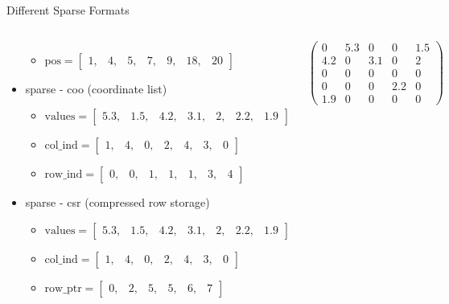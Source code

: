 \documentclass[aspectratio=169,xcolor=dvipsnames]{beamer}
\begin{document}
\begin{frame}{Different Sparse Formats}
\begin{columns}[c]
\begin{itemize}
\begin{itemize}
		\item $\mathrm{pos} = \begin{bmatrix}
		1, & 4, & 5, & 7, & 9, & 18, & 20 
		\end{bmatrix}$
	\end{itemize}
\item sparse - coo (coordinate list)
	\begin{itemize}
		\item $\mathrm{values} = \begin{bmatrix}
		5.3, & 1.5, & 4.2, & 3.1, & 2, & 2.2, & 1.9 
		\end{bmatrix}$
		\item $\mathrm{col\_ind} = \begin{bmatrix}
		1, & 4, & 0, & 2, & 4, & 3, & 0 
		\end{bmatrix}$
		\item $\mathrm{row\_ind} = \begin{bmatrix}
		0, & 0, & 1, & 1, & 1, & 3, & 4 
		\end{bmatrix}$
	\end{itemize}
\item sparse - csr (compressed row storage)
	\begin{itemize}
       \item $\mathrm{values} = \begin{bmatrix}
		5.3, & 1.5, & 4.2, & 3.1, & 2, & 2.2, & 1.9 
		\end{bmatrix}$
		\item $\mathrm{col\_ind} = \begin{bmatrix}
		1, & 4, & 0, & 2, & 4, & 3, & 0 
		\end{bmatrix}$
		\item $\mathrm{row\_ptr} = \begin{bmatrix}
		0, & 2, & 5, & 5, & 6, & 7 
		\end{bmatrix}$
	\end{itemize}
\end{itemize}
        
        $ \left( \begin{array}{rrrrr} 
0 & 5.3 & 0 & 0 & 1.5\\ 
4.2 & 0& 3.1 & 0 & 2\\ 
0 & 0 & 0 & 0 & 0 \\
0 & 0 & 0 & 2.2 & 0 \\
1.9 & 0 & 0 & 0 & 0
\end{array} \right) $

    \end{columns}
\end{frame}
\end{document}
